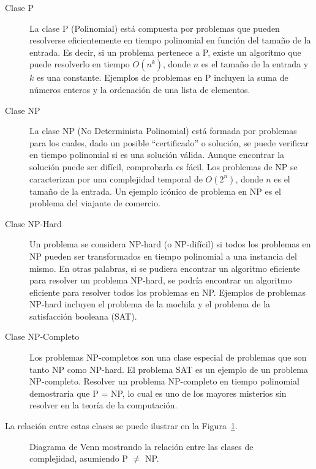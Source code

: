 \begin{description}
\item[Clase P] La clase P (Polinomial) está compuesta por problemas que pueden resolverse eficientemente en tiempo polinomial en función del tamaño de la entrada. Es decir, si un problema pertenece a P, existe un algoritmo que puede resolverlo en tiempo $O(n^k)$, donde $n$ es el tamaño de la entrada y $k$ es una constante. Ejemplos de problemas en P incluyen la suma de números enteros y la ordenación de una lista de elementos.

\item[Clase NP] La clase NP (No Determinista Polinomial) está formada por problemas para los cuales, dado un posible ``certificado'' o solución, se puede verificar en tiempo polinomial si es una solución válida. Aunque encontrar la solución puede ser difícil, comprobarla es fácil. Los problemas de NP se caracterizan por una complejidad temporal de $O(2^n)$, donde $n$ es el tamaño de la entrada. Un ejemplo icónico de problema en NP es el problema del viajante de comercio.

\item[Clase NP-Hard] Un problema se considera NP-hard (o NP-difícil) si todos los problemas en NP pueden ser transformados en tiempo polinomial a una instancia del mismo. En otras palabras, si se pudiera encontrar un algoritmo eficiente para resolver un problema NP-hard, se podría encontrar un algoritmo eficiente para resolver todos los problemas en NP. Ejemplos de problemas NP-hard incluyen el problema de la mochila y el problema de la satisfacción booleana (SAT).

\item[Clase NP-Completo] Los problemas NP-completos son una clase especial de problemas que son tanto NP como NP-hard. El problema SAT es un ejemplo de un problema NP-completo. Resolver un problema NP-completo en tiempo polinomial demostraría que P = NP, lo cual es uno de los mayores misterios sin resolver en la teoría de la computación.

\end{description}

La relación entre estas clases se puede ilustrar en la Figura~\ref{fig:pnp}.
\begin{figure}[H]
    \centering
    \caption{Diagrama de Venn mostrando la relación entre las clases de complejidad, asumiendo P $\neq$ NP.}
    \label{fig:pnp}
\end{figure}

